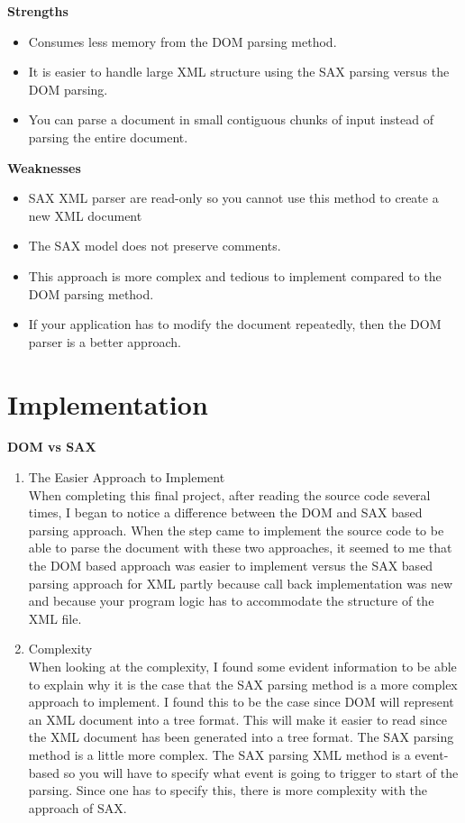 \documentclass[11pt,english]{article}
\begin{document}
\textbf{Strengths}
\begin{itemize}
\item Consumes less memory from the DOM parsing method.
\item It is easier to handle large XML structure using the SAX parsing versus the DOM parsing.
\item You can parse a document in small contiguous chunks of input instead of parsing the entire document.
\end{itemize}
\textbf{Weaknesses}
\begin{itemize}
\item SAX XML parser are read-only so you cannot use this method to create a new XML document
\item The SAX model does not preserve comments.
\item This approach is more complex and tedious to implement compared to the DOM parsing method.
\item If your application has to modify the document repeatedly, then the DOM parser is a better approach.
\end{itemize}
\section{Implementation}

\textbf{DOM vs SAX}
\begin{enumerate}
\item {The Easier Approach to Implement}
\\
When completing this final project, after reading the source code several times, I began to notice a difference between the DOM and SAX based parsing approach. When the step came to implement the source code to be able to parse the document with these two approaches, it seemed to me that the DOM based approach was easier to implement versus the SAX based parsing approach for XML partly because call back implementation was new and because your program logic has to accommodate the structure of the XML file. 
\item {Complexity}
\\
When looking at the complexity, I found some evident information to be able to explain why it is the case that the SAX parsing method is a more complex approach to implement. 
I found this to be the case since DOM will represent an XML document into a tree format. This will make it easier to read since the XML document has been generated into a tree format. The SAX parsing method is a little more complex. The SAX parsing XML method is a event-based so you will have to specify what event is going to trigger to start of the parsing. Since one has to specify this, there is more complexity with the approach of SAX.

\end{enumerate}
\end{document}
